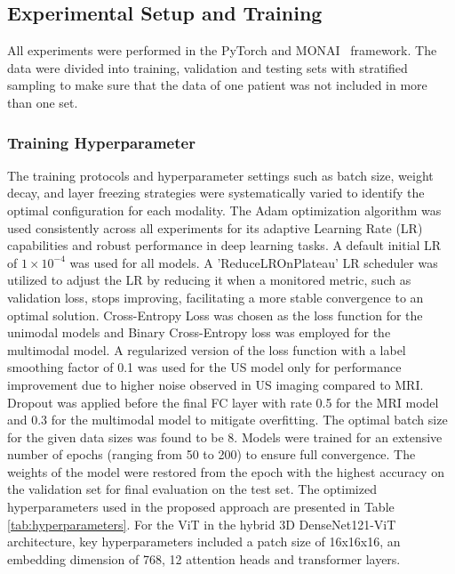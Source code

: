 \documentclass[12pt]{article}
\begin{document}
\subsection{Experimental Setup and Training}

All experiments were performed in the PyTorch and MONAI~\cite{cardoso_2022} framework. The data were divided into training, validation and testing sets with stratified sampling to make sure that the data of one patient was not included in more than one set.

\subsubsection{Training Hyperparameter}

The training protocols and hyperparameter settings such as batch size, weight decay, and layer freezing strategies were systematically varied to identify the optimal configuration for each modality. The Adam optimization algorithm was used consistently across all experiments for its adaptive Learning Rate (LR) capabilities and robust performance in deep learning tasks. A default initial LR of $1 \times 10^{-4}$ was used for all models. A 'ReduceLROnPlateau' LR scheduler was utilized to adjust the LR by reducing it when a monitored metric, such as validation loss, stops improving, facilitating a more stable convergence to an optimal solution. Cross-Entropy Loss was chosen as the loss function for the unimodal models and Binary Cross-Entropy loss was employed for the multimodal model. A regularized version of the loss function with a label smoothing factor of 0.1 was used for the US model only for performance improvement due to higher noise observed in US imaging compared to MRI. Dropout was applied before the final FC layer with rate 0.5 for the MRI model and 0.3 for the multimodal model to mitigate overfitting. The optimal batch size for the given data sizes was found to be 8. Models were trained for an extensive number of epochs (ranging from 50 to 200) to ensure full convergence. The weights of the model were restored from the epoch with the highest accuracy on the validation set for final evaluation on the test set. The optimized hyperparameters used in the proposed approach are presented in Table \ref{tab:hyperparameters}. For the ViT in the hybrid 3D DenseNet121-ViT architecture, key hyperparameters included a patch size of 16x16x16, an embedding dimension of 768, 12 attention heads and transformer layers. 
\end{document}
